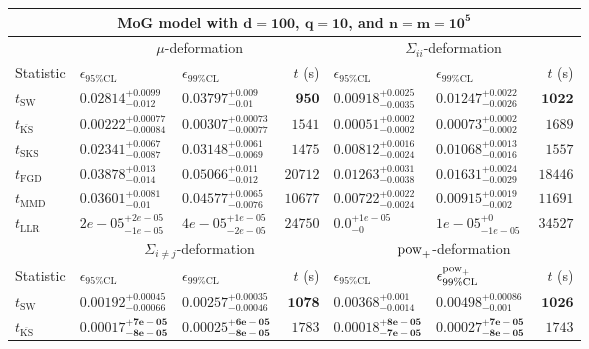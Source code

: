 \begin{tabular}{l|llr|llr}
	\toprule
	\multicolumn{7}{c}{{\bf MoG model with $\mathbf{d=100}$, $\mathbf{q=10}$, and $\mathbf{n=m=10^{5}}$}} \\
	\toprule
	\multicolumn{1}{c}{} & \multicolumn{3}{c}{$\mu$-deformation} & \multicolumn{3}{c}{$\Sigma_{ii}$-deformation} \\
	Statistic & $\epsilon_{95\%\mathrm{CL}}$ & $\epsilon_{99\%\mathrm    {CL}}$ & $t$ (s) & $\epsilon_{95\%\mathrm{CL}}$ & $\epsilon_{99\%\mathrm{CL}}$ & $t$ (s) \\
	\midrule
	$t_{\mathrm{SW}}$ & $0.02814_{-0.012}^{+0.0099}$ & $0.03797_{-0.01}^{+0.009}$ & ${\mathbf{950}}$ & $0.00918_{-0.0035}^{+0.0025}$ & $0.01247_{-0.0026}^{+0.0022}$ & ${\mathbf{1022}}$ \\
	$t_{\overline{\mathrm{KS}}}$ & ${\mathbf{0.00222_{-0.00084}^{+0.00077}}}$ & ${\mathbf{0.00307_{-0.00077}^{+0.00073}}}$ & $1541$ & ${\mathbf{0.00051_{-0.0002}^{+0.0002}}}$ & ${\mathbf{0.00073_{-0.0002}^{+0.0002}}}$ & $1689$ \\
	$t_{\mathrm{SKS}}$ & $0.02341_{-0.0087}^{+0.0067}$ & $0.03148_{-0.0069}^{+0.0061}$ & $1475$ & $0.00812_{-0.0024}^{+0.0016}$ & $0.01068_{-0.0016}^{+0.0013}$ & $1557$ \\
	$t_{\mathrm{FGD}}$ & $0.03878_{-0.014}^{+0.013}$ & $0.05066_{-0.012}^{+0.011}$ & $20712$ & $0.01263_{-0.0038}^{+0.0031}$ & $0.01631_{-0.0029}^{+0.0024}$ & $18446$ \\
	$t_{\mathrm{MMD}}$ & $0.03601_{-0.01}^{+0.0081}$ & $0.04577_{-0.0076}^{+0.0065}$ & $10677$ & $0.00722_{-0.0024}^{+0.0022}$ & $0.00915_{-0.002}^{+0.0019}$ & $11691$ \\
	$t_{\mathrm{LLR}}$ & $2e-05_{-1e-05}^{+2e-05}$ & $4e-05_{-2e-05}^{+1e-05}$ & $24750$ & $0.0_{-0}^{+1e-05}$ & $1e-05_{-1e-05}^{+0}$ & $34527$ \\
	\toprule
	\multicolumn{1}{c}{} & \multicolumn{3}{c}{$\Sigma_{i\neq j}$-deformation} & \multicolumn{3}{c}{$\rm{pow}_{+}$-deformation} \\
	Statistic & $\epsilon_{95\%\mathrm{CL}}$ & $\epsilon_{99\%\mathrm{CL}}$ & $t$ (s) & $\epsilon_{95\%\mathrm{CL}}$ & $\epsilon^{\rm   {pow}_{+}}_{99\%\mathrm{CL}}$ & $t$ (s) \\
	\midrule
	$t_{\mathrm{SW}}$ & $0.00192_{-0.00066}^{+0.00045}$ & $0.00257_{-0.00046}^{+0.00035}$ & ${\mathbf{1078}}$ & $0.00368_{-0.0014}^{+0.001}$ & $0.00498_{-0.001}^{+0.00086}$ & ${\mathbf{1026}}$ \\
	$t_{\overline{\mathrm{KS}}}$ & ${\mathbf{0.00017_{-8e-05}^{+7e-05}}}$ & ${\mathbf{0.00025_{-8e-05}^{+6e-05}}}$ & $1783$ & ${\mathbf{0.00018_{-7e-05}^{+8e-05}}}$ & ${\mathbf{0.00027_{-8e-05}^{+7e-05}}}$ & $1743$ \\

\end{tabular}
